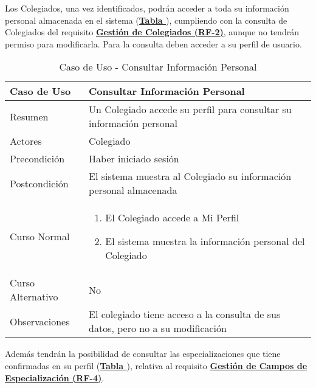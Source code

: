 \addtocounter{tabla}{1}
Los Colegiados, una vez identificados, podrán acceder a toda su información personal almacenada en el sistema (\textbf{\hyperref[tab:cucConsultaInfoPersonal]{Tabla }}), cumpliendo con la consulta de Colegiados del requisito \textbf{\hyperref[tab:rfGestColeg]{Gestión de Colegiados (RF-2)}}, aunque no tendrán permiso para modificarla. Para la consulta deben acceder a su perfil de usuario.

\begin{table}[!htbp]
  \centering  \addtocounter{casouso}{1}
  \begin{tabular}{|l | p{100mm}|}
    \textbf{Caso de Uso}  & \textbf{Consultar Información Personal} \\ \hline
    Resumen 		 & Un Colegiado accede su perfil para consultar su información personal \\ \hline
    Actores  		 & Colegiado \\ \hline
    Precondición  	 & Haber iniciado sesión \\ \hline
    Postcondición  	 & El sistema muestra al Colegiado su información personal almacenada \\ \hline
    Curso Normal   	 & \begin{enumerate}
	  \item El Colegiado accede a Mi Perfil
	  \item El sistema muestra la información personal del Colegiado
    \end{enumerate}  \\ \hline
    Curso Alternativo  & No  \\ \hline
    Observaciones 	 & El colegiado tiene acceso a la consulta de sus datos, pero no a su modificación \\ \hline
  \end{tabular}
  \caption{Caso de Uso  - Consultar Información Personal}
  \label{tab:cucConsultaInfoPersonal}
\end{table}
\FloatBarrier

\addtocounter{tabla}{1}
Además tendrán la posibilidad de consultar las especializaciones que tiene confirmadas en su perfil (\textbf{\hyperref[tab:cucConsultaEspec]{Tabla }}), relativa al requisito \textbf{\hyperref[tab:rfGestEspec]{Gestión de Campos de Especialización (RF-4)}}.

